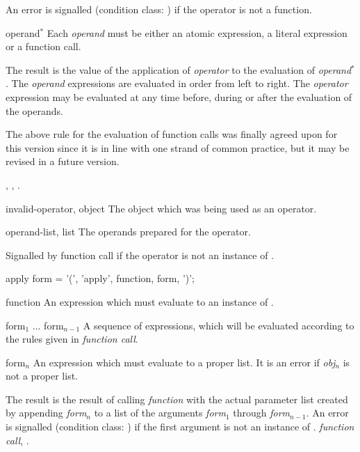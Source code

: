 \begin{optDefinition}
\begin{arguments}
    An error is signalled (condition class:
    ) if the
    operator is not a function.

    \item[operand\/$^*$] Each {\em operand} must be either an atomic expression,
    a literal expression or a function call.
\end{arguments}
%
\result%
The result is the value of the application of {\em operator} to the
evaluation of {\em operand\/$^*$}.
%
\remarks%
The {\em operand} expressions are evaluated in order from left to
right.  The {\em operator} expression may be evaluated at any time
before, during or after the evaluation of the operands.
%
\begin{note}
    The above rule for the evaluation of function calls was finally agreed upon
    for this version since it is in line with one strand of common practice, but
    it may be revised in a future version.
\end{note}
%
\seealso%
, , .

%
\begin{initoptions}
    \item[invalid-operator, object] The object which was being used as an
    operator.

    \item[operand-list, list] The operands prepared for the operator.
\end{initoptions}
%
\remarks%
Signalled by function call if the operator is not an instance of
.

%
\Syntax
\savesyntax\applySyntax\vbox{\small\syntax
apply form
   = '(', 'apply', function, {form}, ')';
\endsyntax}
%
\begin{arguments}
    \item[function] An expression which must evaluate to an instance of
    .

    \item[form$_1$ ... form$_{n-1}$] A sequence of expressions, which will be
    evaluated according to the rules given in {\em function call}.

    \item[form$_n$] An expression which must evaluate to a proper list.  It is
    an error if {\em obj$_n$} is not a proper list.
\end{arguments}
%
\result%
The result is the result of calling {\em function} with the actual parameter
list created by appending {\em form}$_n$ to a list of the arguments {\em
    form}$_1$ through {\em form}$_{n-1}$.  An error is signalled (condition
class: ) if the
first argument is not an instance of .
%
\seealso%
{\em function call}, .
\end{optDefinition}

